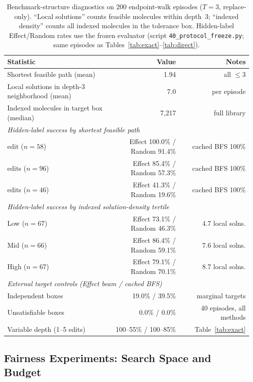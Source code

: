 \begin{table}[t]
\caption{Benchmark-structure diagnostics on 200 endpoint-walk episodes ($T{=}3$, replace-only). ``Local solutions'' counts feasible molecules within depth~3; ``indexed density'' counts all indexed molecules in the tolerance box. Hidden-label Effect/Random rates use the frozen evaluator (script \texttt{40\_protocol\_freeze.py}; same episodes as Tables~\ref{tab:exact}--\ref{tab:direct}).}
\label{tab:benchmark_diag}
\centering
\small
\begin{tabular}{lrr}
\toprule
Statistic & Value & Notes \\
\midrule
Shortest feasible path (mean) & 1.94 & all $\leq 3$ \\
Local solutions in depth-3 neighborhood (mean) & 7.0 & per episode \\
Indexed molecules in target box (median) & 7{,}217 & full library \\
\midrule
\multicolumn{3}{l}{\textit{Hidden-label success by shortest feasible path}} \\
\quad 1 edit ($n{=}58$) & Effect 100.0\% / Random 91.4\% & cached BFS 100\% \\
\quad 2 edits ($n{=}96$) & Effect 85.4\% / Random 57.3\% & cached BFS 100\% \\
\quad 3 edits ($n{=}46$) & Effect 41.3\% / Random 19.6\% & cached BFS 100\% \\
\midrule
\multicolumn{3}{l}{\textit{Hidden-label success by indexed solution-density tertile}} \\
\quad Low ($n{=}67$) & Effect 73.1\% / Random 46.3\% & 4.7 local solns. \\
\quad Mid ($n{=}66$) & Effect 86.4\% / Random 59.1\% & 7.6 local solns. \\
\quad High ($n{=}67$) & Effect 79.1\% / Random 70.1\% & 8.7 local solns. \\
\midrule
\multicolumn{3}{l}{\textit{External target controls (Effect beam / cached BFS)}} \\
\quad Independent boxes & 19.0\% / 39.5\% & marginal targets \\
\quad Unsatisfiable boxes & 0.0\% / 0.0\% & 40 episodes, all methods \\
\quad Variable depth (1--5 edits) & 100--55\% / 100--85\% & Table~\ref{tab:exact} \\
\bottomrule
\end{tabular}
\end{table}

\subsection{Fairness Experiments: Search Space and Budget}
\label{sec:fairness}

